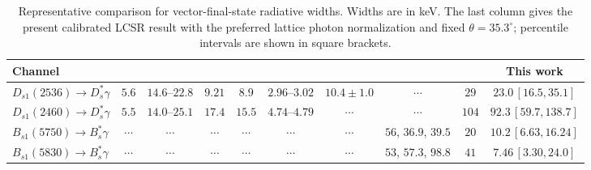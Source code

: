 \begin{widetext}
\begin{table}[t]
\caption{Representative comparison for vector-final-state radiative widths. Widths are in keV. The last column gives the present calibrated LCSR result with the preferred lattice photon normalization and fixed $\theta=35.3^\circ$; percentile intervals are shown in square brackets.}
\label{tab:vector-final-literature}
\begin{ruledtabular}
\begin{tabular}{lccccccccc}
Channel & \cite{Godfrey:2005ww} & \cite{Goity:2000dk} & \cite{Green:2016occ} & \cite{Radford:2009bs} & \cite{Chen:2020ejk} & \cite{Korner:1992pz} & \cite{Li:2021qgz,Godfrey:2016nwn,Lu:2016bbk} & \cite{Bondar:2025smw} & This work\\
\hline
$D_{s1}(2536)\to D_s^\ast\gamma$ & $5.6$ & $14.6$--$22.8$ & $9.21$ & $8.9$ & $2.96$--$3.02$ & $10.4\pm1.0$ & $\cdots$ & $29$ & $23.0\,[16.5,35.1]$\\
$D_{s1}(2460)\to D_s^\ast\gamma$ & $5.5$ & $14.0$--$25.1$ & $17.4$ & $15.5$ & $4.74$--$4.79$ & $\cdots$ & $\cdots$ & $104$ & $92.3\,[59.7,138.7]$\\
$B_{s1}(5750)\to B_s^\ast\gamma$ & $\cdots$ & $\cdots$ & $\cdots$ & $\cdots$ & $\cdots$ & $\cdots$ & $56$, $36.9$, $39.5$ & $20$ & $10.2\,[6.63,16.24]$\\
$B_{s1}(5830)\to B_s^\ast\gamma$ & $\cdots$ & $\cdots$ & $\cdots$ & $\cdots$ & $\cdots$ & $\cdots$ & $53$, $57.3$, $98.8$ & $41$ & $7.46\,[3.30,24.0]$\\
\end{tabular}
\end{ruledtabular}
\end{table}
\end{widetext}

